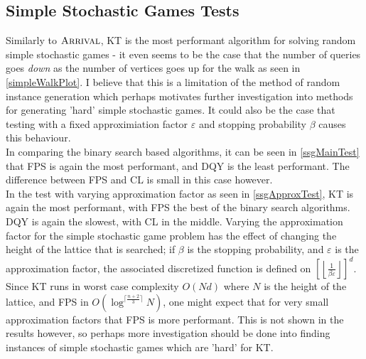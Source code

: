 \subsection{Simple Stochastic Games Tests}
Similarly to $\textsc{Arrival}$, KT is the most performant algorithm for solving
random simple stochastic games - it even seems to be the case
that the number of queries goes \emph{down} as the number of vertices
goes up for the walk as seen in \cref{simpleWalkPlot}. 
I believe that this is a limitation of the method
of random instance generation which perhaps motivates further investigation
into methods for generating 'hard' simple stochastic games. It could also
be the case that testing with a fixed approximiation factor $\varepsilon$
and stopping probability $\beta$ causes this behaviour. \\
In comparing the binary search based algorithms, it can be seen in \cref{ssgMainTest} 
that
FPS is again the most performant, and DQY is the least performant. The difference
between FPS and CL is small in this case however. \\
In the test with varying approximation factor as seen in \cref{ssgApproxTest}, KT 
is again the most performant, with FPS the best of the binary search algorithms.
DQY is again the slowest, with CL in the middle. Varying the approximation factor
for the simple stochastic game problem has the effect of changing the height of the lattice
that is searched; if $\beta$ is the stopping probability, and $\varepsilon$ is the approximation
factor, the associated discretized function is 
defined on $\left[\left \lfloor \frac{1}{\beta \varepsilon}\right \rfloor\right]^d$.
Since KT runs in worst case complexity $O(Nd)$ where $N$ is the height of the lattice,
and FPS in $O(\log^{\lceil \frac{n + 2}{3} \rceil} N)$, one might expect that for
very small approximation factors that FPS is more performant. This is not shown in
the results however, so perhaps more investigation should be done into finding
instances of simple stochastic games which are 'hard' for KT.

